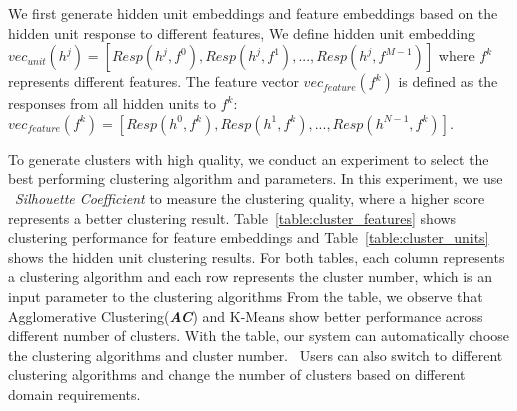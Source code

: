 We first generate hidden unit embeddings and feature embeddings based on the hidden unit response to different features, 
We define hidden unit embedding $vec_{unit}(h^j) = [Resp(h^j, f^0), Resp(h^j, f^1), ..., Resp(h^j, f^{M-1})]$ where $f^k$ represents different features.
The feature vector $vec_{feature}(f^k) $ is defined as the responses from all hidden units to $f^k$: $vec_{feature}(f^k) = [Resp(h^0, f^k), Resp(h^1, f^k), ..., Resp(h^{N-1}, f^k)]$. 

To generate clusters with high quality, we conduct an experiment to select the best performing clustering algorithm and parameters.
In this experiment, we use ~\textit{Silhouette Coefficient} to measure the clustering quality, where a higher score represents a better clustering result.
Table~\ref{table:cluster_features} shows clustering performance for feature embeddings and Table~\ref{table:cluster_units} shows the hidden unit clustering results.
For both tables, each column represents a clustering algorithm and each row represents the cluster number, which is an input parameter to the clustering algorithms
From the table, we observe that Agglomerative Clustering(\textbf{\textit{AC}}) and K-Means show better performance across different number of clusters.
With the table, our system can automatically choose the clustering algorithms and cluster number.~ 
Users can also switch to different clustering algorithms and change the number of clusters based on different domain requirements.

